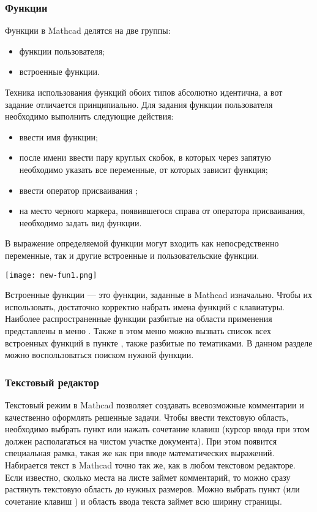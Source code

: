 \subsubsection*{Функции}
Функции в Mathcad делятся на две группы:
\begin{itemize}
\item функции пользователя;
\item встроенные функции.
\end{itemize}
Техника использования функций обоих типов абсолютно идентична, а вот задание отличается принципиально. Для задания функции пользователя необходимо выполнить следующие действия:
\begin{itemize}
	\item ввести имя функции;
	\item после имени ввести пару круглых скобок, в которых через запятую необходимо указать все переменные, от которых зависит функция;
	\item ввести оператор присваивания \mc{:=};
	\item на место черного маркера, появившегося справа от оператора присваивания, необходимо задать вид функции.
\end{itemize}

В выражение определяемой функции могут входить как непосредственно переменные, так и другие встроенные и пользовательские функции. 
\begin{center}
	\texttt{[image: new-fun1.png]}
\end{center}

Встроенные функции --- это функции, заданные в Mathcad изначально. Чтобы их использовать, достаточно корректно набрать имена функций с клавиатуры. Наиболее распространенные функции разбитые на области применения  представлены в меню . Также в этом меню можно вызвать список всех встроенных функций в пункте  , также разбитые по тематиками. В данном разделе можно воспользоваться поиском нужной функции.


\subsubsection*{Текстовый редактор}

Текстовый режим в Mathcad позволяет создавать всевозможные комментарии и качественно оформлять решенные задачи.
Чтобы ввести текстовую область, необходимо выбрать пункт  или  нажать сочетание клавиш  (курсор ввода при этом должен располагаться на чистом участке документа). При этом появится специальная рамка, такая же как при вводе математических выражений.
Набирается текст в Mathcad точно так же, как в любом текстовом редакторе. Если известно, сколько места на листе займет комментарий, то можно сразу растянуть текстовую область до нужных размеров. Можно выбрать пункт   (или сочетание клавиш  ) и область ввода текста займет всю ширину страницы.

